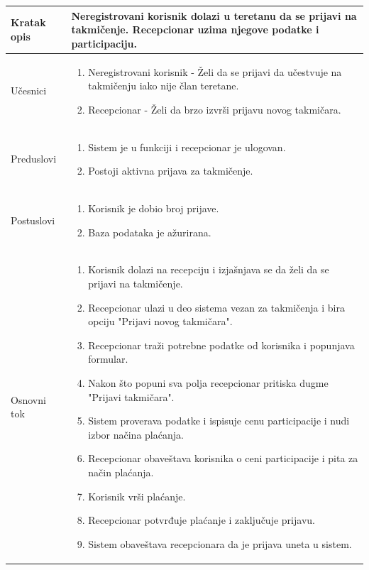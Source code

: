 \documentclass[../../main.tex]{subfiles}
\begin{document}
\begin{longtable}{| p{} | p{} |} 
\hline
    Kratak opis &  Neregistrovani korisnik dolazi u teretanu da se prijavi na takmičenje. Recepcionar uzima njegove podatke i participaciju. \\ 
\hline    
    Učesnici & \begin{enumerate}
        \item Neregistrovani korisnik - Želi da se prijavi da učestvuje na takmičenju iako nije član teretane.
        \item Recepcionar - Želi da brzo izvrši prijavu novog takmičara.
    \end{enumerate}\\
\hline
   Preduslovi & \begin{enumerate}
       \item Sistem je u funkciji i recepcionar je ulogovan.
       \item Postoji aktivna prijava za takmičenje.
   \end{enumerate}\\
\hline  
    Postuslovi & \begin{enumerate}
        \item Korisnik je dobio broj prijave.
        \item Baza podataka je ažurirana.
    \end{enumerate}\\
\hline
    Osnovni tok & \begin{enumerate}
        \item Korisnik dolazi na recepciju i izjašnjava se da želi da se prijavi na takmičenje.
        \item Recepcionar ulazi u deo sistema vezan za takmičenja i bira opciju "Prijavi novog takmičara".
        \item Recepcionar traži potrebne podatke od korisnika i popunjava formular. 
        \item Nakon što popuni sva polja recepcionar pritiska dugme "Prijavi takmičara".
        \item Sistem proverava podatke i ispisuje cenu participacije i nudi izbor načina plaćanja.
        \item Recepcionar obaveštava korisnika o ceni participacije i pita za način plaćanja.
        \item Korisnik vrši plaćanje.
        \item Recepcionar potvrđuje plaćanje i zaključuje prijavu.
        \item Sistem obaveštava recepcionara da je prijava uneta u sistem.

\end{enumerate}
\end{longtable}
\end{document}
